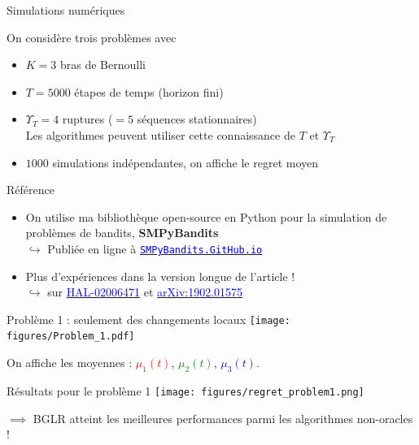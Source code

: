 \documentclass[11pt,french,ignorenonframetext,]{beamer}
\begin{document}
\begin{frame}{Simulations numériques}

  \begin{block}{On considère trois problèmes avec}
    \begin{itemize}
      \item
      $K=3$ bras de Bernoulli
      \item
      $T=5000$ étapes de temps (horizon fini)
      \item
      $\Upsilon_T=4$ ruptures ($=5$ séquences stationnaires)\\
      Les algorithmes peuvent utiliser cette connaissance de $T$ et $\Upsilon_T$
      \item
      $1000$ simulations indépendantes, on affiche le regret moyen
    \end{itemize}
  \end{block}

  \pause

  \begin{exampleblock}{Référence}
    \begin{itemize}
      \item
      On utilise ma bibliothèque open-source en Python pour la simulation de problèmes de bandits, \textbf{SMPyBandits}
      \\
      $\hookrightarrow$ Publiée en ligne à \href{https://SMPyBandits.GitHub.io}{\textcolor{blue}{\texttt{SMPyBandits.GitHub.io}}}
      \item
      Plus d'expériences dans la version longue de l'article !\\
      $\hookrightarrow$ sur
      \href{https://hal.inria.fr/hal-02006471}{\textcolor{blue}{HAL-02006471}}
      et
      \href{https://arxiv.org/abs/1902.01575}{\textcolor{blue}{arXiv:1902.01575}}
    \end{itemize}
  \end{exampleblock}

\end{frame}


\begin{frame}[plain]{Problème 1 : seulement des changements locaux}
  \centering
  \texttt{[image: figures/Problem\_1.pdf]}

  On affiche les moyennes :
  \textcolor{red}{$\mu_1(t)$},
  \textcolor{green}{$\mu_2(t)$},
  \textcolor{blue}{$\mu_3(t)$}.
\end{frame}

\begin{frame}[plain]{Résultats pour le problème 1}
  \centering
  \texttt{[image: figures/regret\_problem1.png]}

  $\implies$ BGLR atteint les meilleures performances parmi les algorithmes non-oracles \dCooley{} !
\end{frame}
\end{document}
